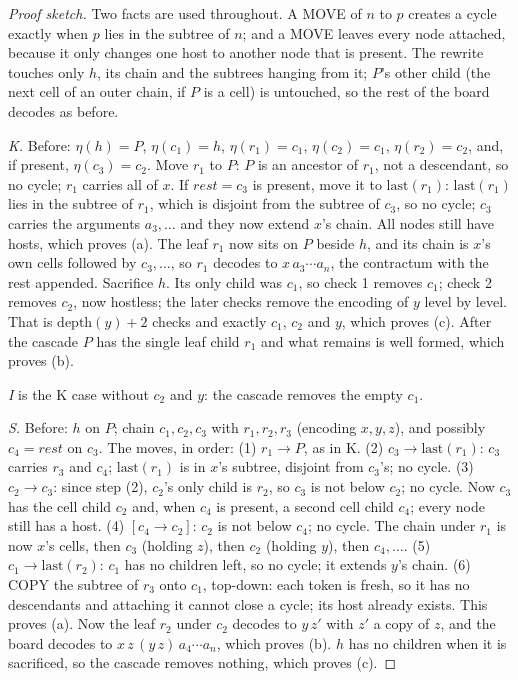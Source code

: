 \documentclass[11pt]{article}
\theoremstyle{definition}
\newcommand{\last}{\mathrm{last}}
\newcommand{\rest}{\mathit{rest}}
\newcommand{\mv}{\to}
\begin{document}
\begin{proof}[Proof sketch]
Two facts are used throughout. A MOVE of $n$ to $p$ creates a cycle exactly when $p$ lies
in the subtree of $n$; and a MOVE leaves every node attached, because it only changes one
host to another node that is present. The rewrite touches only $h$, its chain and the
subtrees hanging from it; $P$'s other child (the next cell of an outer chain, if $P$ is a
cell) is untouched, so the rest of the board decodes as before.

\emph{K.} Before: $\eta(h)=P$, $\eta(c_1)=h$, $\eta(r_1)=c_1$, $\eta(c_2)=c_1$,
$\eta(r_2)=c_2$, and, if present, $\eta(c_3)=c_2$. Move $r_1$ to $P$: $P$ is an ancestor of
$r_1$, not a descendant, so no cycle; $r_1$ carries all of $x$. If $\rest=c_3$ is present,
move it to $\last(r_1)$: $\last(r_1)$ lies in the subtree of $r_1$, which is disjoint from
the subtree of $c_3$, so no cycle; $c_3$ carries the arguments $a_3,\dots$ and they now
extend $x$'s chain. All nodes still have hosts, which proves (a). The leaf $r_1$ now sits
on $P$ beside $h$, and its chain is $x$'s own cells followed by $c_3,\dots$, so $r_1$
decodes to $x\,a_3\cdots a_n$, the contractum with the rest appended. Sacrifice $h$. Its
only child was $c_1$, so check 1 removes $c_1$; check 2 removes $c_2$, now hostless; the
later checks remove the encoding of $y$ level by level. That is $\mathrm{depth}(y)+2$
checks and exactly $c_1$, $c_2$ and $y$, which proves (c). After the cascade $P$ has the
single leaf child $r_1$ and what remains is well formed, which proves (b).

\emph{I} is the K case without $c_2$ and $y$: the cascade removes the empty $c_1$.

\emph{S.} Before: $h$ on $P$; chain $c_1,c_2,c_3$ with $r_1,r_2,r_3$ (encoding $x,y,z$),
and possibly $c_4=\rest$ on $c_3$. The moves, in order:
(1) $r_1\mv P$, as in K.
(2) $c_3\mv\last(r_1)$: $c_3$ carries $r_3$ and $c_4$; $\last(r_1)$ is in $x$'s subtree,
disjoint from $c_3$'s; no cycle.
(3) $c_2\mv c_3$: since step (2), $c_2$'s only child is $r_2$, so $c_3$ is not below $c_2$;
no cycle. Now $c_3$ has the cell child $c_2$ and, when $c_4$ is present, a second cell
child $c_4$; every node still has a host.
(4) $[c_4\mv c_2]$: $c_2$ is not below $c_4$; no cycle. The chain under $r_1$ is now
$x$'s cells, then $c_3$ (holding $z$), then $c_2$ (holding $y$), then $c_4,\dots$.
(5) $c_1\mv\last(r_2)$: $c_1$ has no children left, so no cycle; it extends $y$'s chain.
(6) COPY the subtree of $r_3$ onto $c_1$, top-down: each token is fresh, so it has no
descendants and attaching it cannot close a cycle; its host already exists.
This proves (a). Now the leaf $r_2$ under $c_2$ decodes to $y\,z'$ with $z'$ a copy of
$z$, and the board decodes to $x\,z\,(y\,z)\,a_4\cdots a_n$, which proves (b). $h$ has no
children when it is sacrificed, so the cascade removes nothing, which proves (c).


\end{proof}
\end{document}
